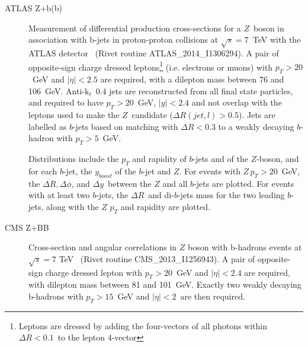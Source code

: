 \documentclass[11pt]{cernrep}
\newcommand{\pt}{\ensuremath{p_{T}}\xspace}
\begin{document}
\begin{description}
\item[ATLAS Z+b(b)] Measurement of differential production cross-sections for a $Z$\ boson
  in association with b-jets in proton-proton collisions at $\sqrt{s} =
  7$~TeV with the ATLAS detector~\cite{Aad:2014dvb} (Rivet routine
  ATLAS\_2014\_I1306294). A pair of opposite-sign charge dressed
  leptons\footnote{Leptons are dressed by adding the four-vectors of all
    photons within $\Delta R<0.1$\ to the lepton 4-vector} (i.e. electrons or
  muons) with $\pt>20$~GeV and $|\eta|<2.5$ are required, with a dilepton
  mass between 76 and 106~GeV. Anti-k$_{t}$\ 0.4 jets are reconstructed from
  all final state particles, and required to have $\pt>$20~GeV, $|y|<2.4$ and
  not overlap with the leptons used to make the $Z$~candidate ($\Delta R(jet,
  l)> 0.5$). Jets are labelled as $b$-jets based on matching with $\Delta
  R<0.3$ to a weakly decaying $b$-hadron with $\pt>5$~GeV.

  Distributions include the \pt and rapidity of $b$-jets and of the
  $Z$-boson, and for each $b$-jet, the $y_{boost}$ of the $b$-jet and
  $Z$. For events with $Z\, \pt>20$~GeV, the $\Delta R, \Delta\phi$, and
  $\Delta y$\ between the $Z$ and all $b$-jets are plotted. For events with
  at least two $b$-jets, the $\Delta R$\ and di-$b$-jets mass for the two
  leading $b$-jets, along with the $Z$ \pt and rapidity are plotted.


\item[CMS Z+BB] Cross-section and angular correlations in $Z$ boson with b-hadrons
  events at $\sqrt{s} = 7$ TeV~\cite{Chatrchyan:2013zja} (Rivet routine
  CMS\_2013\_I1256943). A pair of opposite-sign charge dressed lepton with
  $\pt>20$~GeV and $|\eta|<2.4$ are required, with dilepton mass between 81
  and 101~GeV. Exactly two weakly decaying b-hadrons with $\pt>15$~GeV and
  $|\eta|<2$\ are then required.


\end{description}
\end{document}
